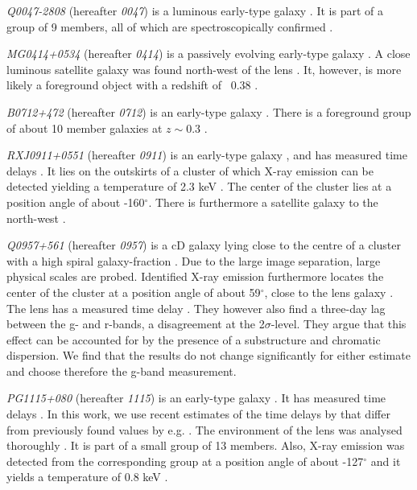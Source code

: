 \documentclass[useAMS,usenatbib]{mn2e}
\begin{document}
\textit{Q0047-2808} (hereafter \textit{0047}) is a luminous early-type galaxy \citep{1996MNRAS.278..139W}. It is part of a group of 9 members, all of which are spectroscopically confirmed \citep{2011ApJ...726...84W}.

\textit{MG0414+0534} (hereafter \textit{0414}) is a passively evolving early-type galaxy \citep{1999AJ....117.2034T}. A close luminous satellite galaxy was found north-west of the lens \citep{1993AJ....105....1S}. It, however, is more likely a foreground object with a redshift of ~0.38 \citep{2011MNRAS.413L..86C}.

\textit{B0712+472} (hereafter \textit{0712}) is an early-type galaxy \citep{1998MNRAS.296..483J,1998AJ....115..377F}. There is a foreground group of about 10 member galaxies at $z\sim0.3$ \citep{2002AJ....123..627F}.

\textit{RXJ0911+0551} (hereafter \textit{0911}) is an early-type galaxy \citep{1997A&A...317L..13B,2012A&A...538A..99S}, and has measured time delays \citep{2002ApJ...572L..11H}. It lies on the outskirts of a cluster of which X-ray emission can be detected yielding a temperature of 2.3 keV \citep{2001ApJ...555....1M}. The center of the cluster lies at a position angle of about -160$^{\circ}$. There is furthermore a satellite galaxy to the north-west \citep{2000ApJ...544L..35K}.

\textit{Q0957+561} (hereafter \textit{0957}) is a cD galaxy lying close to the centre of a cluster with a high spiral galaxy-fraction \citep[e.g.][]{1992MNRAS.254P..27G,1994A&A...291..411A,1998ApJ...504..661C}. Due to the large image separation, large physical scales are probed. Identified X-ray emission furthermore locates the center of the cluster at a position angle of about 59$^{\circ}$, close to the lens galaxy \citep{2002ApJ...565...96C}. The lens has a measured time delay \citep[e.g.][]{2012A&A...540A.132S}. They however also find a three-day lag between the g- and r-bands, a disagreement at the 2$\sigma$-level. They argue that this effect can be accounted for by the presence of a substructure and chromatic dispersion. We find that the results do not change significantly for either estimate and choose therefore the g-band measurement.

\textit{PG1115+080} (hereafter \textit{1115}) is an early-type galaxy \citep{1980Natur.285..641W,2005ApJ...626...51Y}. It has measured time delays \citep[see e.g.][]{1997ApJ...475L..85S}. In this work, we use recent estimates of the time delays by \citet{2010MNRAS.406.2764T} that differ from previously found values by e.g. \citet{1997ApJ...489...21B}. The environment of the lens was analysed thoroughly \citep{2006ApJ...641..169M,2011ApJ...726...84W}. It is part of a small group of 13 members. Also, X-ray emission was detected from the corresponding group at a position angle of about -127$^{\circ}$ and it yields a temperature of 0.8 keV \citep{2004ApJ...610..686G}.
\end{document}

